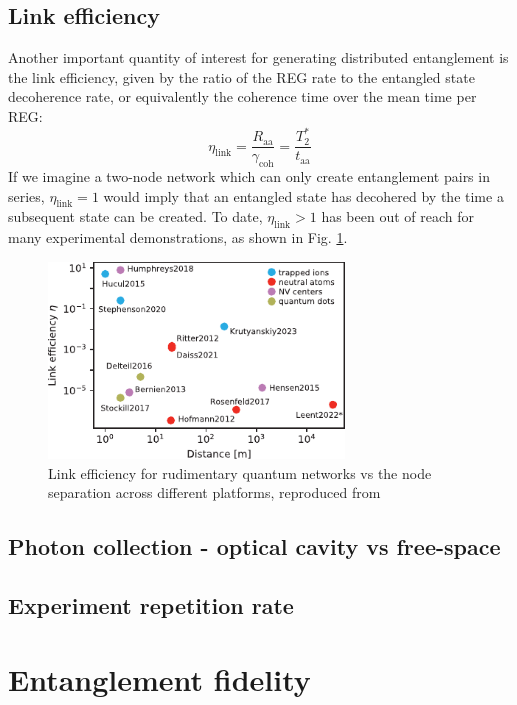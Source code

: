\subsection{Link efficiency}
Another important quantity of interest for generating distributed entanglement is the link efficiency, given by the ratio of the REG rate to the entangled state decoherence rate, or equivalently the coherence time over the mean time per REG:
\begin{equation}
    \eta_{\text{link}} = \frac{R_{\text{aa}}}{\gamma_{\text{coh}}} = \frac{T_2^*}{t_{\text{aa}}}
\end{equation}
If we imagine a two-node network which can only create entanglement pairs in series, $\eta_{\text{link}}=1$ would imply that an entangled state has decohered by the time a subsequent state can be created. To date, $\eta_{\text{link}}>1$ has been out of reach for many experimental demonstrations, as shown in Fig. \ref{fig:covey_link_eff}.

\begin{figure}[!ht]
    \centering
    \includegraphics[width=0.7\textwidth]{Images/covey_link_efficiency.pdf}
    \caption{Link efficiency for rudimentary quantum  networks vs the node separation across different platforms, reproduced from \cite{Covey2023}}
    \label{fig:covey_link_eff}
\end{figure}

\subsection{Photon collection - optical cavity vs free-space}
\subsection{Experiment repetition rate}
\section{Entanglement fidelity}
